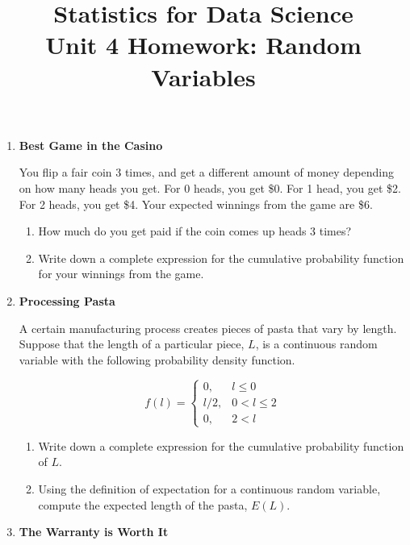 \documentclass[12pt,a4paper]{article}
\numberwithin{equation}{subsection}
\begin{document}
\title{Statistics for Data Science \\
       Unit 4 Homework: Random Variables}
\maketitle

\begin{enumerate}

\item \textbf{Best Game in the Casino}

You flip a fair coin 3 times, and get a different amount of money depending on how many heads you get. For 0 heads, you get \$0. For 1 head, you get \$2. For 2 heads, you get \$4. Your expected winnings from the game are \$6. 

\begin{enumerate}
\item How much do you get paid if the coin comes up heads 3 times?
\item Write down a complete expression for the cumulative probability function for your winnings from the game.
\end{enumerate}

\item \textbf{Processing Pasta}

A certain manufacturing process creates pieces of pasta that vary by length.  Suppose that the length of a particular piece, $L$, is a continuous random variable with the following probability density function.

$$f(l) = \begin{cases} 0, &l \leq 0 \\
l/2, &0 < l \leq 2 \\ 
0, &2 < l
\end{cases}
$$

\begin{enumerate}
\item Write down a complete expression for the cumulative probability function of $L$.
\item Using the definition of expectation for a continuous random variable, compute the expected length of the pasta, $E(L)$.
\end{enumerate}

\item \textbf{The Warranty is Worth It}


\end{enumerate}
\end{document}
